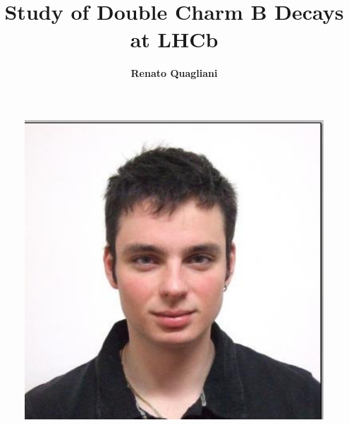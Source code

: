 \documentclass[11pt]{article}
\begin{document}
\vspace*{2cm}
\title{Study of Double Charm B Decays at LHCb}
\author{\Large\bf Renato Quagliani}

\address{Laboratoire de l'Accélérateur Linéaire (LAL), LHCb group,\\
 Orsay, France}

\begin{figure}
\begin{center}
\includegraphics[bb=-306 1160 675 100, scale=0.265]{figs/07b901e.eps}
\end{center}
\end{figure}
\end{document}
